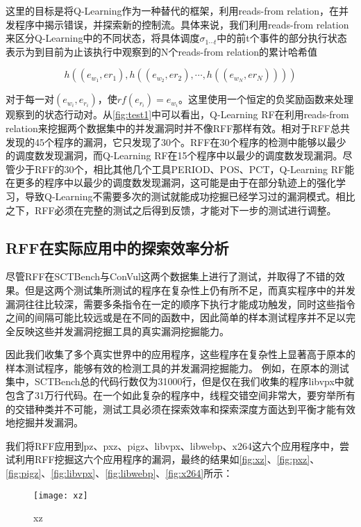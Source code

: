 这里的目标是将Q-Learning作为一种替代的框架，利用reads-from relation，在并发程序中揭示错误，并探索新的控制流。具体来说，我们利用reads-from relation来区分Q-Learning中的不同状态，将具体调度$\sigma_{1\cdots t}$中的前t个事件的部分执行状态表示为到目前为止该执行中观察到的N个reads-from relation的累计哈希值

$$
h((e_{w_1}, e{r_1}), h((e_{w_2}, e{r_2}), \cdots, h((e_{w_N}, e{r_N}))))
$$

对于每一对$(e_{w_i}, e_{r_i})$，使$rf(e_{r_i})=e_{w_i}$。这里使用一个恒定的负奖励函数来处理观察到的状态行动对。从\autoref{fig:test1}中可以看出，Q-Learning RF在利用reads-from relation来挖掘两个数据集中的并发漏洞时并不像RFF那样有效。相对于RFF总共发现的45个程序的漏洞，它只发现了30个。RFF在30个程序的检测中能够以最少的调度数发现漏洞，而Q-Learning RF在15个程序中以最少的调度数发现漏洞。尽管少于RFF的30个，相比其他几个工具PERIOD、POS、PCT，Q-Learning RF能在更多的程序中以最少的调度数发现漏洞，这可能是由于在部分轨迹上的强化学习，导致Q-Learning不需要多次的测试就能成功挖掘已经学习过的漏洞模式。相比之下，RFF必须在完整的测试之后得到反馈，才能对下一步的测试进行调整。

\subsection{RFF在实际应用中的探索效率分析}

尽管RFF在SCTBench与ConVul这两个数据集上进行了测试，并取得了不错的效果。但是这两个测试集所测试的程序在复杂性上仍有所不足，而真实程序中的并发漏洞往往比较深，需要多条指令在一定的顺序下执行才能成功触发，同时这些指令之间的间隔可能比较远或是在不同的函数中，因此简单的样本测试程序并不足以完全反映这些并发漏洞挖掘工具的真实漏洞挖掘能力。

因此我们收集了多个真实世界中的应用程序，这些程序在复杂性上显著高于原本的样本测试程序，能够有效的检测工具的并发漏洞挖掘能力。
例如，在原本的测试集中，SCTBench总的代码行数仅为31000行，但是仅在我们收集的程序libvpx中就包含了31万行代码。在一个如此复杂的程序中，线程交错空间非常大，要穷举所有的交错种类并不可能，测试工具必须在探索效率和探索深度方面达到平衡才能有效地挖掘并发漏洞。

我们将RFF应用到pz、pxz、pigz、libvpx、libwebp、x264这六个应用程序中，尝试利用RFF挖掘这六个应用程序的漏洞，最终的结果如\autoref{fig:xz}、\autoref{fig:pxz}、\autoref{fig:pigz}、\autoref{fig:libvpx}、\autoref{fig:libwebp}、\autoref{fig:x264}所示：

\begin{figure}[ht]
    \centering
    \texttt{[image: xz]}
    \caption{\label{fig:xz}xz}
\end{figure}

